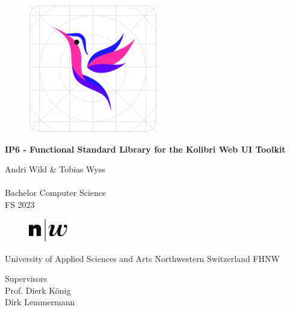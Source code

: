 






\begin{titlepage}
\begin{center}

    \begin{figure}[H]
        \centering
        \includegraphics[width=0.50\textwidth]{./frontmatter/pictures/kolibri-logo}
    \end{figure}

    \vspace*{1cm}
    {\huge \bfseries IP6 - Functional Standard Library for the Kolibri Web UI
    Toolkit  \\ }
    \vspace{2cm}
    {\large 
      Andri Wild \& Tobias Wyss\\

    	~\\
    	Bachelor Computer Science\\
    	\vspace{2.0cm}
    	FS 2023\\
    	\vspace{1.0cm}
    \begin{figure}[h]
        \centering
        \includegraphics[width=0.15\textwidth]{./frontmatter/pictures/fhnw_e_10mm.jpg}
    \end{figure}
    	University of Applied Sciences and Arts Northwestern Switzerland FHNW
        ~\\
    }




{\large
	Supervisors \\[\baselineskip]
	Prof. Dierk König\\
	Dirk Lemmermann\\[1cm]
}
\end{center}
\end{titlepage}

\begin{titlepage}
\thispagestyle{empty}
\newpage
\mbox{}
\end{titlepage}
